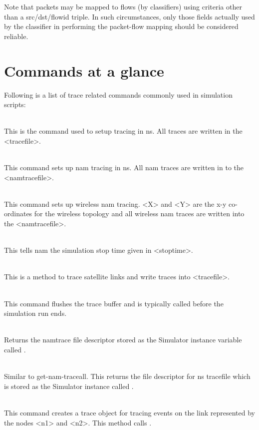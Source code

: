 Note that packets may be mapped to flows (by classifiers) using
criteria other than a src/dst/flowid triple.
In such circumstances, only those fields actually used by
the classifier in performing the packet-flow mapping should be
considered reliable.


\section{Commands at a glance}
\label{sec:tracecommand}

Following is a list of trace related commands commonly used in
simulation scripts:
\begin{flushleft}
\\
This is the command used to setup tracing in ns. All traces are written in
the <tracefile>.


\\
This command sets up nam tracing in ns. All nam traces are written in to
the <namtracefile>.


\\
This command sets up wireless nam tracing. <X> and <Y> are the x-y co-ordinates
for the wireless topology and all wireless nam traces are written  into
the <namtracefile>.


\\
This tells nam the simulation stop time  given in <stoptime>.


\\
This is a method to trace satellite links and write traces into <tracefile>.


\\
This command flushes the trace buffer and is typically called before the
simulation run ends.


\\
Returns the namtrace file descriptor stored as the Simulator instance
variable called .


\\
Similar to get-nam-traceall. This returns the file descriptor for ns tracefile
which is stored as the Simulator instance called .


\\
This command creates a trace object for tracing events on the link represented
by the nodes <n1> and <n2>. This method calls .



\end{flushleft}
